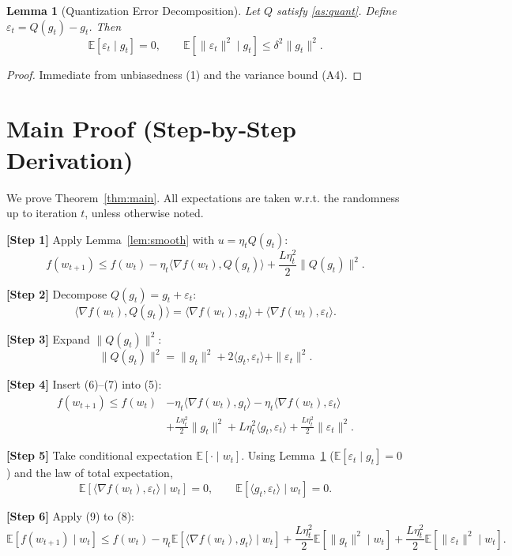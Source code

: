 \documentclass{article}
\newtheorem{lemma}{Lemma}
\newcommand{\E}{\mathbb{E}}
\begin{document}
\begin{lemma}[Quantization Error Decomposition]\label{lem:quant}
Let $Q$ satisfy \ref{as:quant}. Define $\varepsilon_{t}=Q(g_{t})-g_{t}$. Then
\[
\E[\varepsilon_{t}\mid g_{t}]=0,\qquad
\E[\|\varepsilon_{t}\|^{2}\mid g_{t}]\le\delta^{2}\|g_{t}\|^{2}.
\tag{L2}
\]
\end{lemma}
\begin{proof}
Immediate from unbiasedness (1) and the variance bound (A4).
\end{proof}

\section*{Main Proof (Step‑by‑Step Derivation)}
We prove Theorem~\ref{thm:main}. All expectations are taken w.r.t. the randomness up to iteration $t$, unless otherwise noted.

\noindent\textbf{[Step 1]} Apply Lemma~\ref{lem:smooth} with $u=\eta_{t}Q(g_{t})$:
\[
f(w_{t+1})\le f(w_{t})-\eta_{t}\langle\nabla f(w_{t}),Q(g_{t})\rangle
+\frac{L\eta_{t}^{2}}{2}\|Q(g_{t})\|^{2}.
\tag{5}
\]

\noindent\textbf{[Step 2]} Decompose $Q(g_{t})=g_{t}+\varepsilon_{t}$:
\[
\langle\nabla f(w_{t}),Q(g_{t})\rangle
= \langle\nabla f(w_{t}),g_{t}\rangle
+ \langle\nabla f(w_{t}),\varepsilon_{t}\rangle .
\tag{6}
\]

\noindent\textbf{[Step 3]} Expand $\|Q(g_{t})\|^{2}$:
\[
\|Q(g_{t})\|^{2}= \|g_{t}\|^{2}+2\langle g_{t},\varepsilon_{t}\rangle+\|\varepsilon_{t}\|^{2}.
\tag{7}
\]

\noindent\textbf{[Step 4]} Insert (6)–(7) into (5):
\[
\begin{aligned}
f(w_{t+1})\le f(w_{t}) 
&-\eta_{t}\langle\nabla f(w_{t}),g_{t}\rangle
-\eta_{t}\langle\nabla f(w_{t}),\varepsilon_{t}\rangle \\
&+\frac{L\eta_{t}^{2}}{2}\|g_{t}\|^{2}
+L\eta_{t}^{2}\langle g_{t},\varepsilon_{t}\rangle
+\frac{L\eta_{t}^{2}}{2}\|\varepsilon_{t}\|^{2}.
\end{aligned}
\tag{8}
\]

\noindent\textbf{[Step 5]} Take conditional expectation $\E[\cdot\mid w_{t}]$.
Using Lemma~\ref{lem:quant} ($\E[\varepsilon_{t}\mid g_{t}]=0$) and the law of total expectation,
\[
\E[\langle\nabla f(w_{t}),\varepsilon_{t}\rangle\mid w_{t}]
=0,\qquad
\E[\langle g_{t},\varepsilon_{t}\rangle\mid w_{t}]=0 .
\tag{9}
\]

\noindent\textbf{[Step 6]} Apply (9) to (8):
\[
\E[f(w_{t+1})\mid w_{t}]
\le f(w_{t})-\eta_{t}\E[\langle\nabla f(w_{t}),g_{t}\rangle\mid w_{t}]
+\frac{L\eta_{t}^{2}}{2}\E[\|g_{t}\|^{2}\mid w_{t}]
+\frac{L\eta_{t}^{2}}{2}\E[\|\varepsilon_{t}\|^{2}\mid w_{t}].
\tag{10}
\]
\end{document}
